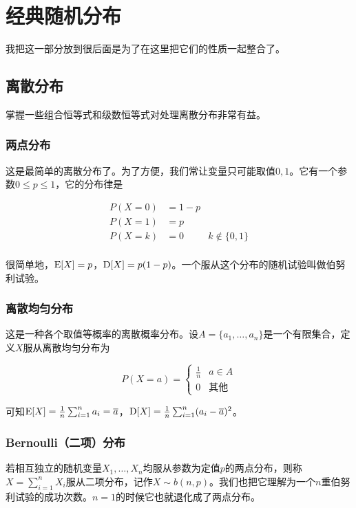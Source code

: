 \section{经典随机分布}

我把这一部分放到很后面是为了在这里把它们的性质一起整合了。

\subsection{离散分布}

掌握一些组合恒等式和级数恒等式对处理离散分布非常有益。

\subsubsection{两点分布}

这是最简单的离散分布了。为了方便，我们常让变量只可能取值$0,1$。它有一个参数$0\leq p\leq 1$，它的分布律是

\begin{align*}
P(X=0)&=1-p\\
P(X=1)&=p\\
P(X=k)&=0&k\notin \{0,1\}\\
\end{align*}

很简单地，$\operatorname{E}[X]=p$，$\operatorname{D}[X]=p(1-p)$。一个服从这个分布的随机试验叫做伯努利试验。

\subsubsection{离散均匀分布}
这是一种各个取值等概率的离散概率分布。设$A=\{a_1,\ldots,a_n\}$是一个有限集合，定义$X$服从离散均匀分布为

\[
P(X=a)=\begin{cases}
    \frac1n & a\in A\\
    0 & 其他
\end{cases}
\]

可知$\operatorname{E}[X]=\frac1n\sum_{i=1}^na_i=\overline{a}$，$\operatorname{D}[X]=\frac1n\sum_{i=1}^n(a_i-\overline{a})^2$。

\subsubsection{Bernoulli（二项）分布}
若相互独立的随机变量$X_1,\ldots,X_n$均服从参数为定值$p$的两点分布，则称$X=\sum_{i=1}^nX_i$服从二项分布，记作$X\sim b(n,p)$。我们也把它理解为一个$n$重伯努利试验的成功次数。$n=1$的时候它也就退化成了两点分布。

